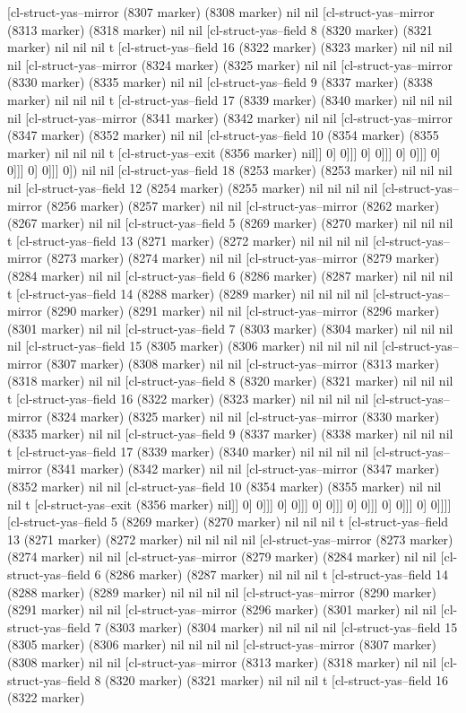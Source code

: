 {{[cl-struct-yas--mirror (8307 marker) (8308 marker) nil nil [cl-struct-yas--mirror (8313 marker) (8318 marker) nil nil [cl-struct-yas--field 8 (8320 marker) (8321 marker) nil nil nil t [cl-struct-yas--field 16 (8322 marker) (8323 marker) nil nil nil nil [cl-struct-yas--mirror (8324 marker) (8325 marker) nil nil [cl-struct-yas--mirror (8330 marker) (8335 marker) nil nil [cl-struct-yas--field 9 (8337 marker) (8338 marker) nil nil nil t [cl-struct-yas--field 17 (8339 marker) (8340 marker) nil nil nil nil [cl-struct-yas--mirror (8341 marker) (8342 marker) nil nil [cl-struct-yas--mirror (8347 marker) (8352 marker) nil nil [cl-struct-yas--field 10 (8354 marker) (8355 marker) nil nil nil t [cl-struct-yas--exit (8356 marker) nil]] 0] 0]]] 0] 0]]] 0] 0]]] 0] 0]]] 0] 0]]] 0]) nil nil [cl-struct-yas--field 18 (8253 marker) (8253 marker) nil nil nil nil [cl-struct-yas--field 12 (8254 marker) (8255 marker) nil nil nil nil [cl-struct-yas--mirror (8256 marker) (8257 marker) nil nil [cl-struct-yas--mirror (8262 marker) (8267 marker) nil nil [cl-struct-yas--field 5 (8269 marker) (8270 marker) nil nil nil t [cl-struct-yas--field 13 (8271 marker) (8272 marker) nil nil nil nil [cl-struct-yas--mirror (8273 marker) (8274 marker) nil nil [cl-struct-yas--mirror (8279 marker) (8284 marker) nil nil [cl-struct-yas--field 6 (8286 marker) (8287 marker) nil nil nil t [cl-struct-yas--field 14 (8288 marker) (8289 marker) nil nil nil nil [cl-struct-yas--mirror (8290 marker) (8291 marker) nil nil [cl-struct-yas--mirror (8296 marker) (8301 marker) nil nil [cl-struct-yas--field 7 (8303 marker) (8304 marker) nil nil nil nil [cl-struct-yas--field 15 (8305 marker) (8306 marker) nil nil nil nil [cl-struct-yas--mirror (8307 marker) (8308 marker) nil nil [cl-struct-yas--mirror (8313 marker) (8318 marker) nil nil [cl-struct-yas--field 8 (8320 marker) (8321 marker) nil nil nil t [cl-struct-yas--field 16 (8322 marker) (8323 marker) nil nil nil nil [cl-struct-yas--mirror (8324 marker) (8325 marker) nil nil [cl-struct-yas--mirror (8330 marker) (8335 marker) nil nil [cl-struct-yas--field 9 (8337 marker) (8338 marker) nil nil nil t [cl-struct-yas--field 17 (8339 marker) (8340 marker) nil nil nil nil [cl-struct-yas--mirror (8341 marker) (8342 marker) nil nil [cl-struct-yas--mirror (8347 marker) (8352 marker) nil nil [cl-struct-yas--field 10 (8354 marker) (8355 marker) nil nil nil t [cl-struct-yas--exit (8356 marker) nil]] 0] 0]]] 0] 0]]] 0] 0]]] 0] 0]]] 0] 0]]] 0] 0]]]] [cl-struct-yas--field 5 (8269 marker) (8270 marker) nil nil nil t [cl-struct-yas--field 13 (8271 marker) (8272 marker) nil nil nil nil [cl-struct-yas--mirror (8273 marker) (8274 marker) nil nil [cl-struct-yas--mirror (8279 marker) (8284 marker) nil nil [cl-struct-yas--field 6 (8286 marker) (8287 marker) nil nil nil t [cl-struct-yas--field 14 (8288 marker) (8289 marker) nil nil nil nil [cl-struct-yas--mirror (8290 marker) (8291 marker) nil nil [cl-struct-yas--mirror (8296 marker) (8301 marker) nil nil [cl-struct-yas--field 7 (8303 marker) (8304 marker) nil nil nil nil [cl-struct-yas--field 15 (8305 marker) (8306 marker) nil nil nil nil [cl-struct-yas--mirror (8307 marker) (8308 marker) nil nil [cl-struct-yas--mirror (8313 marker) (8318 marker) nil nil [cl-struct-yas--field 8 (8320 marker) (8321 marker) nil nil nil t [cl-struct-yas--field 16 (8322 marker) }}
